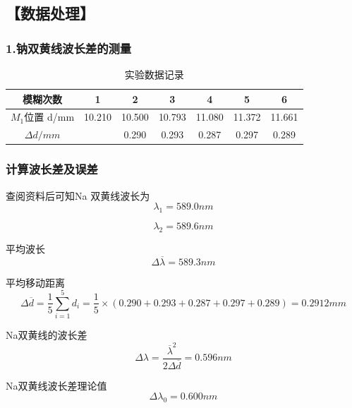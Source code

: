 \documentclass[12pt,a4paper,UTF8]{ctexart}
\begin{document}
\subsection*{【数据处理】}
\subsubsection*{1.钠双黄线波长差的测量}

\begin{table}[htbp]
	\centering
	\caption{实验数据记录}
	\begin{tabular}{ccccccc}
	\toprule
    模糊次数 & 1 & 2 & 3 & 4 & 5 & 6 \\
	\midrule
    $M_1$位置 d/mm &10.210 & 10.500 & 10.793 & 11.080 & 11.372 &11.661 \\
    $\varDelta d / mm $ & & 0.290 & 0.293 & 0.287 & 0.297 & 0.289 \\
	\bottomrule
	\end{tabular}%
	\label{tab:device}%
\end{table}%

\subsubsection*{计算波长差及误差}

查阅资料后可知Na 双黄线波长为
\begin{equation*}
    \lambda_1=589.0nm
\end{equation*}

\begin{equation*}
	\lambda_2=589.6nm
\end{equation*}

平均波长
\begin{equation*}
	\varDelta \overline{\lambda} =589.3nm
\end{equation*}

平均移动距离
\begin{equation*}
	\varDelta \overline{d}= \frac{1}{5}\sum_{i = 1}^{5}  d_i=\frac{1}{5} \times (0.290+0.293+0.287+0.297+0.289)=0.2912mm
\end{equation*} 

Na双黄线的波长差
\begin{equation*}
	\varDelta \lambda=\frac{\overline{\lambda}^{2}}{2\varDelta \overline{d}}=0.596nm
\end{equation*}

Na双黄线波长差理论值
\begin{equation*}
	\varDelta \lambda_0=0.600nm
\end{equation*}
\end{document}
